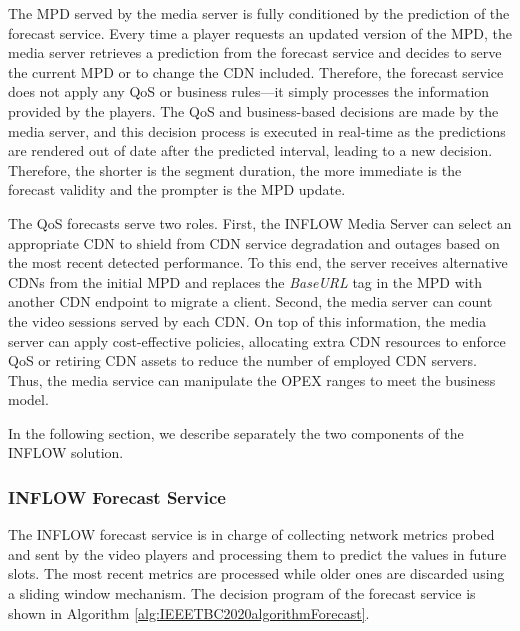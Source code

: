 The MPD served by the media server is fully conditioned by the prediction of the forecast service. Every time a player requests an updated version of the MPD, the media server retrieves a prediction from the forecast service and decides to serve the current MPD or to change the CDN included. Therefore, the forecast service does not apply any QoS or business rules—it simply processes the information provided by the players. The QoS and business-based decisions are made by the media server, and this decision process is executed in real-time as the predictions are rendered out of date after the predicted interval, leading to a new decision. Therefore, the shorter is the segment duration, the more immediate is the forecast validity and the prompter is the MPD update.

The QoS forecasts serve two roles. First, the INFLOW Media Server can select an appropriate CDN to shield from CDN service degradation and outages based on the most recent detected performance. To this end, the server receives alternative CDNs from the initial MPD and replaces the \textit{BaseURL} tag in the MPD with another CDN endpoint to migrate a client. Second, the media server can count the video sessions served by each CDN. On top of this information, the media server can apply cost-effective policies, allocating extra CDN resources to enforce QoS or retiring CDN assets to reduce the number of employed CDN servers. Thus, the media service can manipulate the OPEX ranges to meet the business model.

In the following section, we describe separately the two components of the INFLOW solution.

\subsubsection{INFLOW Forecast Service}
\label{sec:forecastservice}

The INFLOW forecast service is in charge of collecting network metrics probed and sent by the video players and processing them to predict the values in future slots. The most recent metrics are processed while older ones are discarded using a sliding window mechanism. The decision program of the forecast service is shown in Algorithm \ref{alg:IEEETBC2020algorithmForecast}.

